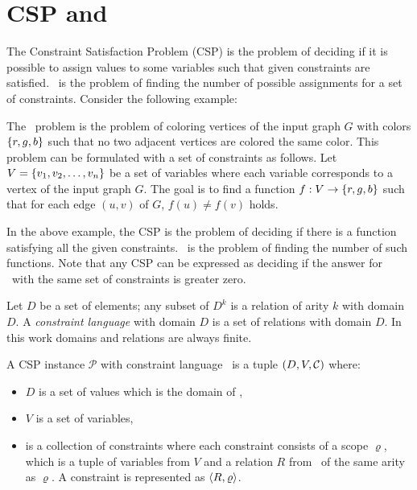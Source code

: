 \chapter{CSP and \ccsp} 
The Constraint Satisfaction Problem (CSP) is the problem of deciding if it is possible to
assign values to some variables such that given constraints are satisfied. \ccsp\ 
is the problem of finding the number of possible assignments for a set of constraints.
Consider the following example:

\begin{example}[\tcoloring]\label{exm:3col}
The \tcoloring\ problem is the problem of coloring vertices of the input graph \(G\)
with colors \(\{{r,g,b}\}\) such that no two adjacent vertices are colored the same color.
This problem can be formulated with a set of constraints as follows.
Let \(V=\{{v_1,v_2,\dotsc,v_n}\}\)
be a set of variables where each variable corresponds to a vertex of
the input graph \(G\)\@. The goal is to find a function
\(f:V\to \{{r,g,b}\}\) such that for each edge \((u,v)\) of \(G\), \(f(u)\neq f(v)\) holds.
\end{example}
In the above example,
the CSP is the problem of deciding
if there is a function satisfying all the given constraints. \ccsp\ is the
problem of finding the number of such functions. Note that any CSP can be expressed as 
deciding if the answer for \ccsp\ with the same set of constraints is greater zero.


Let \(D\) be a set of elements; any subset of \(D^k\) is a relation of arity \(k\) with
domain \(D\)\@. A \emph{constraint language} with domain \(D\) is a set of
relations with domain \(D\)\@.
In this work domains and relations are always finite.

A CSP instance \(\mathcal{P}\) with constraint language \mrelset\ is a tuple 
\((D,V,\mathcal{C})\) where:
\begin{itemize}
\item \(D\) is a set of values which is the domain of \mrelset,
\item \(V\) is a set of variables,
\item \mconset is a collection of constraints where each constraint consists of a scope \(\varrho\),
which is a tuple of variables from \(V\) and a relation \(R\) from \mrelset\
of the same arity as \(\varrho\)\@. A constraint is represented as \(\langle R, \varrho \rangle\)\@.
\end{itemize}

